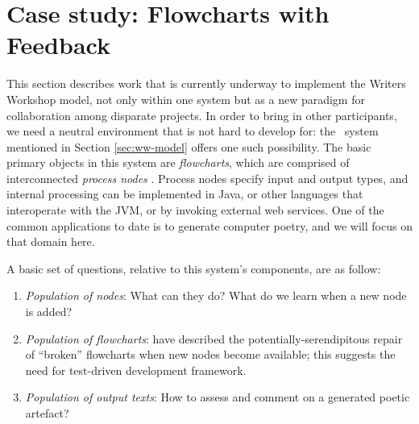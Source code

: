 \section{Case study: Flowcharts with Feedback} \label{sec:implementation}

This section describes work that is currently underway to implement the
Writers Workshop model, not only within one system but as a new paradigm
for collaboration among disparate projects.  In order to
bring in other participants, we need a neutral environment that is not
hard to develop for: the \Fw\ system mentioned in Section
\ref{sec:ww-model} offers one such possibility.  The basic primary
objects in this system are \emph{flowcharts}, which are comprised of
interconnected \emph{process nodes}
\cite{charnley2014flowr,colton-flowcharting}.  Process nodes specify
input and output types, and internal processing can be implemented in
Java, or other languages that interoperate with the JVM, or by
invoking external web services.  One of the common applications to
date is to generate computer poetry, and we will focus on that domain
here.

A basic set of questions, relative to this system's components, are as 
follow:
\begin{enumerate}
\item \emph{Population of nodes}: What can they do?  What do we learn
  when a new node is added?
\item \emph{Population of flowcharts}: 
  have described the potentially-serendipitous repair of ``broken''
  flowcharts when new nodes become available; this suggests the need for
  test-driven development framework.
\item \emph{Population of output texts}: How to assess and comment on
  a generated poetic artefact?
\end{enumerate}

